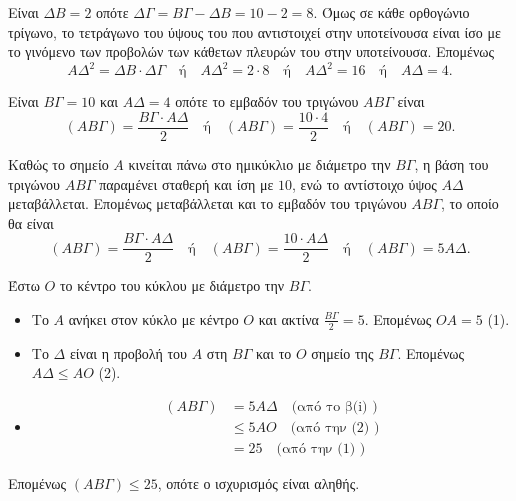 \begin{alist}
    \item[α)] \begin{rlist}
        \item Είναι $\Delta B = 2$ οπότε $\Delta \Gamma = B\Gamma - \Delta B = 10 - 2 = 8$. Όμως σε κάθε ορθογώνιο τρίγωνο, το τετράγωνο του ύψους του που αντιστοιχεί στην υποτείνουσα είναι ίσο με το γινόμενο των προβολών των κάθετων πλευρών του στην υποτείνουσα. Επομένως \[ A\Delta^2 = \Delta B \cdot \Delta \Gamma \quad \text{ή} \quad A\Delta^2 = 2 \cdot 8 \quad \text{ή} \quad A\Delta^2 = 16 \quad \text{ή} \quad A\Delta = 4. \]
        \item Είναι $B\Gamma = 10$ και $A\Delta = 4$ οπότε το εμβαδόν του τριγώνου $AB\Gamma$ είναι \[ (AB\Gamma) = \frac{B\Gamma \cdot A\Delta}{2} \quad \text{ή} \quad (AB\Gamma) = \frac{10 \cdot 4}{2} \quad \text{ή} \quad (AB\Gamma) = 20. \]
    \end{rlist}
    \item[β)] \begin{rlist}
        \item Καθώς το σημείο $A$ κινείται πάνω στο ημικύκλιο με διάμετρο την $B\Gamma$, η βάση του τριγώνου $AB\Gamma$ παραμένει σταθερή και ίση με $10$, ενώ το αντίστοιχο ύψος $A\Delta$ μεταβάλλεται. Επομένως μεταβάλλεται και το εμβαδόν του τριγώνου $AB\Gamma$, το οποίο θα είναι \[ (AB\Gamma) = \frac{B\Gamma \cdot A\Delta}{2} \quad \text{ή} \quad (AB\Gamma) = \frac{10 \cdot A\Delta}{2} \quad \text{ή} \quad (AB\Gamma) = 5A\Delta. \]
        \item Έστω $O$ το κέντρο του κύκλου με διάμετρο την $B\Gamma$.
    \end{rlist}
\end{alist}

\begin{itemize}
    \item Το $A$ ανήκει στον κύκλο με κέντρο $O$ και ακτίνα $\frac{B\Gamma}{2} = 5$. Επομένως $OA = 5$ (1).
    \item Το $\Delta$ είναι η προβολή του $A$ στη $B\Gamma$ και το $O$ σημείο της $B\Gamma$. Επομένως $A\Delta \le AO$ (2).
    \item \begin{align*}
        (AB\Gamma) &= 5A\Delta \quad \text{(από το β(i) )} \\
                   &\le 5AO \quad \text{(από την (2) )} \\
                   &= 25 \quad \text{(από την (1) )}
    \end{align*}
\end{itemize}
Επομένως $(AB\Gamma) \le 25$, οπότε ο ισχυρισμός είναι αληθής.